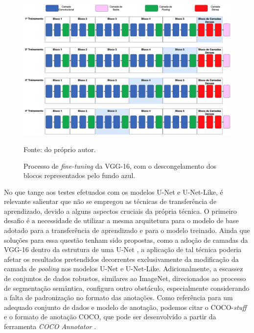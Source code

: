 \begin{figure}[H]
    \centering
    \caption[Processo de \textit{fine-tuning} da VGG-16.]{Processo de \textit{fine-tuning} da VGG-16, com o descongelamento dos blocos representados pelo fundo azul.}
    \includegraphics[width=1\textwidth]{recursos/imagens/project/fine-tunning.png}
    \label{project:fig:transf1}

    Fonte: do próprio autor.
\end{figure}


No que tange aos testes efetuados com os modelos U-Net e U-Net-Like, é relevante salientar que não se empregou as técnicas de transferência de aprendizado, devido a alguns aspectos cruciais da própria técnica. O primeiro desafio é a necessidade de utilizar a mesma arquitetura para o modelo de base adotado para a transferência de aprendizado e para o modelo treinado. Ainda que soluções para essa questão tenham sido propostas, como a adoção de camadas da VGG-16 dentro da estrutura de uma U-Net \citep{Pravitasari2020UNet-VGG16Segmentation}, a aplicação de tal técnica poderia afetar os resultados pretendidos decorrentes exclusivamente da modificação da camada de \textit{pooling} nos modelos U-Net e U-Net-Like. Adicionalmente, a escassez de conjuntos de dados robustos, similares ao ImageNet, direcionados ao processo de segmentação semântica, configura outro obstáculo, especialmente considerando a falta de padronização no formato das anotações. Como referência para um adequado conjunto de dados e modelo de anotação, podemos citar o COCO-\textit{stuff} \citep{Caesar2016} e o formato de anotação COCO, que pode ser desenvolvido a partir da ferramenta \textit{COCO Annotator} \citep{Brooks2019COCOAnnotator}.


